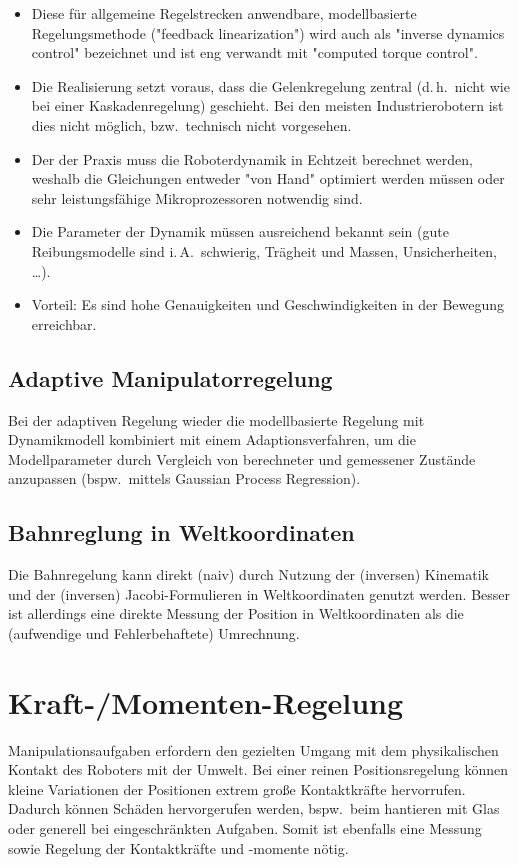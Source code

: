 \documentclass[a4paper, 11pt, accentcolor = tud3b]{tudreport}
\renewcommand{\dh}{d.\,h.~}
\newcommand{\bzw}{bzw.~}
\newcommand{\bspw}{bspw.~}
\newcommand{\iA}{i.\,A.~}
\begin{document}
				\begin{itemize}
					\item Diese für allgemeine Regelstrecken anwendbare, modellbasierte Regelungsmethode ("feedback linearization") wird auch als "inverse dynamics control" bezeichnet und ist eng verwandt mit "computed torque control".
					\item Die Realisierung setzt voraus, dass die Gelenkregelung zentral (\dh nicht wie bei einer Kaskadenregelung) geschieht. Bei den meisten Industrierobotern ist dies nicht möglich, \bzw technisch nicht vorgesehen.
					\item Der der Praxis muss die Roboterdynamik in Echtzeit berechnet werden, weshalb die Gleichungen entweder "von Hand" optimiert werden müssen oder sehr leistungsfähige Mikroprozessoren notwendig sind.
					\item Die Parameter der Dynamik müssen ausreichend bekannt sein (gute Reibungsmodelle sind \iA schwierig, Trägheit und Massen, Unsicherheiten, \dots).
					\item Vorteil: Es sind hohe Genauigkeiten und Geschwindigkeiten in der Bewegung erreichbar.
				\end{itemize}

			\subsection{Adaptive Manipulatorregelung}
				Bei der adaptiven Regelung wieder die modellbasierte Regelung mit Dynamikmodell kombiniert mit einem Adaptionsverfahren, um die Modellparameter durch Vergleich von berechneter und gemessener Zustände anzupassen (\bspw mittels Gaussian Process Regression).

			\subsection{Bahnreglung in Weltkoordinaten}
				\label{sec:cartesian_control}
			
				Die Bahnregelung kann direkt (naiv) durch Nutzung der (inversen) Kinematik und der (inversen) Jacobi-Formulieren in Weltkoordinaten genutzt werden. Besser ist allerdings eine direkte Messung der Position in Weltkoordinaten als die (aufwendige und Fehlerbehaftete) Umrechnung.

		\section{Kraft-/Momenten-Regelung}
			Manipulationsaufgaben erfordern den gezielten Umgang mit dem physikalischen Kontakt des Roboters mit der Umwelt. Bei einer reinen Positionsregelung können kleine Variationen der Positionen extrem große Kontaktkräfte hervorrufen. Dadurch können Schäden hervorgerufen werden, \bspw beim hantieren mit Glas oder generell bei eingeschränkten Aufgaben. Somit ist ebenfalls eine Messung sowie Regelung der Kontaktkräfte und -momente nötig.
			
\end{document}
